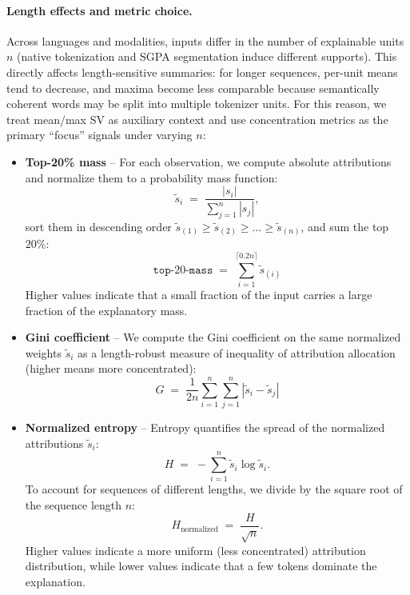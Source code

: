 \paragraph{Length effects and metric choice.}
Across languages and modalities, inputs differ in the number of explainable units $n$ (native tokenization and SGPA segmentation induce different supports). This directly affects length-sensitive summaries: for longer sequences, per-unit means tend to decrease, and maxima become less comparable because semantically coherent words may be split into multiple tokenizer units. For this reason, we treat mean/max SV as auxiliary context and use concentration metrics as the primary ``focus'' signals under varying $n$:

\begin{itemize}
    \item \textbf{Top-20\% mass} --
        For each observation, we compute absolute attributions and normalize them to a probability mass function:
        \[
        \tilde{s}_i \;=\; \frac{|s_i|}{\sum_{j=1}^{n} |s_j|},
        \]
        sort them in descending order $\tilde{s}_{(1)} \ge \tilde{s}_{(2)} \ge \dots \ge \tilde{s}_{(n)}$, and sum the top $20\%$:
        \[
        \texttt{top-$20$-mass} \;=\; \sum_{i=1}^{\lceil 0.2n \rceil} \tilde{s}_{(i)}
        \]
        Higher values indicate that a small fraction of the input carries a large fraction of the explanatory mass.

    \item \textbf{Gini coefficient} --
        We compute the Gini coefficient on the same normalized weights $\tilde{s}_i$ as a length-robust measure of inequality of attribution allocation (higher means more concentrated):
        \[
        G \;=\; \frac{1}{2n}\sum_{i=1}^{n}\sum_{j=1}^{n} \left|\tilde{s}_i - \tilde{s}_j\right|
        \]

    \item \textbf{Normalized entropy} --
        Entropy quantifies the spread of the normalized attributions $\tilde{s}_i$:
        \[
        H \;=\; -\sum_{i=1}^{n} \tilde{s}_i \log \tilde{s}_i.
        \]
        To account for sequences of different lengths, we divide by the square root of the sequence length $n$:
        \[
        H_{\text{normalized}} \;=\; \frac{H}{\sqrt{n}}.
        \]
        Higher values indicate a more uniform (less concentrated) attribution distribution, while lower values indicate that a few tokens dominate the explanation.
\end{itemize}

